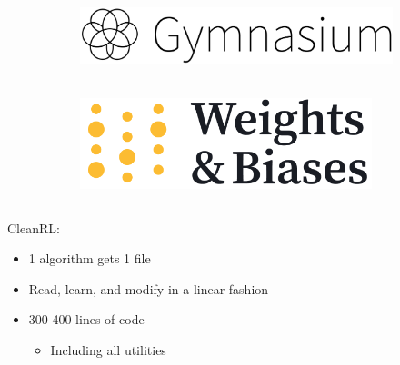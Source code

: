 \documentclass[
  letterpaper,
  DIV=11,
  numbers=noendperiod,
  oneside]{scrartcl}
\providecommand{\tightlist}{%
  \setlength{\itemsep}{0pt}\setlength{\parskip}{0pt}}\usepackage{longtable,booktabs,array}
\begin{document}
\begin{figure}

\begin{minipage}{0.50\linewidth}

\begin{figure}[H]

{\centering \includegraphics[width=\textwidth,height=1.04167in]{figs/package_gymnasium.png}

}


\end{figure}%

\end{minipage}%
%
\begin{minipage}{0.50\linewidth}

\begin{figure}[H]

{\centering \includegraphics[width=\textwidth,height=1.04167in]{figs/package_wandb.png}

}


\end{figure}%

\end{minipage}%

\end{figure}%

\subsection{}\label{section-37}

CleanRL:

\begin{itemize}
\tightlist
\item
  1 algorithm gets 1 file
\item
  Read, learn, and modify in a linear fashion
\item
  300-400 lines of code

  \begin{itemize}
  \tightlist
  \item
    Including all utilities
  \end{itemize}
\end{itemize}
\end{document}
